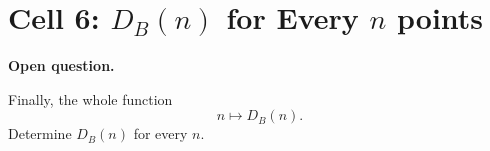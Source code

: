 \documentclass[11pt]{article}
\theoremstyle{definition}
\newcommand{\DB}{D_B}
\newcommand{\cell}[3]{%
  \section*{Cell #1: #2\hfill{\normalsize\mdseries #3}}}
\begin{document}
\cell{6}{$\DB(n)$ for Every $n$}{13 points}

\textbf{Open question.}

Finally, the whole function
\[
  n \longmapsto \DB(n).
\]
Determine $\DB(n)$ for every $n$.
\end{document}
